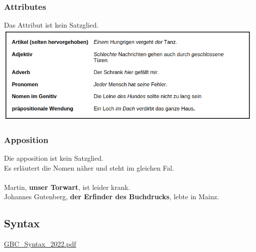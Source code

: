 \subsubsection{Attributes}
Das Attribut ist kein Satzglied.\\

\includegraphics[width=\textwidth]{./german/imgs/attribut.png}

\subsubsection{Apposition}

Die apposition ist kein Satzglied.\\
Es erläutert die Nomen näher und steht im gleichen Fal.\\
\\
Martin, \textbf{unser Torwart}, ist leider krank.\\
Johannes Gutenberg, \textbf{der Erfinder des Buchdrucks}, lebte in Mainz.


\subsection{Syntax}

\href{run:./includes/german/GBC/GBC_Syntax_2022.pdf}{GBC\_Syntax\_2022.pdf}

